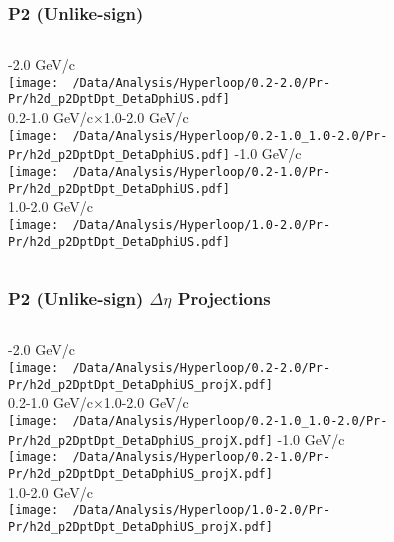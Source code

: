 \documentclass{beamer}
\begin{document}
\begin{frame}
	\frametitle{P2 (Unlike-sign)}
	\begin{columns}
		-2.0 GeV/c\\
		\texttt{[image: ~/Data/Analysis/Hyperloop/0.2-2.0/Pr-Pr/h2d\_p2DptDpt\_DetaDphiUS.pdf]}\\0.2-1.0 GeV/c$\times$1.0-2.0 GeV/c\\
		\texttt{[image: ~/Data/Analysis/Hyperloop/0.2-1.0\_1.0-2.0/Pr-Pr/h2d\_p2DptDpt\_DetaDphiUS.pdf]}
		-1.0 GeV/c\\
		\texttt{[image: ~/Data/Analysis/Hyperloop/0.2-1.0/Pr-Pr/h2d\_p2DptDpt\_DetaDphiUS.pdf]}\\1.0-2.0 GeV/c\\
		\texttt{[image: ~/Data/Analysis/Hyperloop/1.0-2.0/Pr-Pr/h2d\_p2DptDpt\_DetaDphiUS.pdf]}
	\end{columns}
\end{frame}
\begin{frame}
	\frametitle{P2 (Unlike-sign) $\Delta\eta$ Projections}
	\begin{columns}
		\column{0.5\textwidth}
		-2.0 GeV/c\\
		\texttt{[image: ~/Data/Analysis/Hyperloop/0.2-2.0/Pr-Pr/h2d\_p2DptDpt\_DetaDphiUS\_projX.pdf]}\\0.2-1.0 GeV/c$\times$1.0-2.0 GeV/c\\
		\texttt{[image: ~/Data/Analysis/Hyperloop/0.2-1.0\_1.0-2.0/Pr-Pr/h2d\_p2DptDpt\_DetaDphiUS\_projX.pdf]}
		\column{0.5\textwidth}
		-1.0 GeV/c\\
		\texttt{[image: ~/Data/Analysis/Hyperloop/0.2-1.0/Pr-Pr/h2d\_p2DptDpt\_DetaDphiUS\_projX.pdf]}\\1.0-2.0 GeV/c\\
		\texttt{[image: ~/Data/Analysis/Hyperloop/1.0-2.0/Pr-Pr/h2d\_p2DptDpt\_DetaDphiUS\_projX.pdf]}
	\end{columns}
\end{frame}
\end{document}
